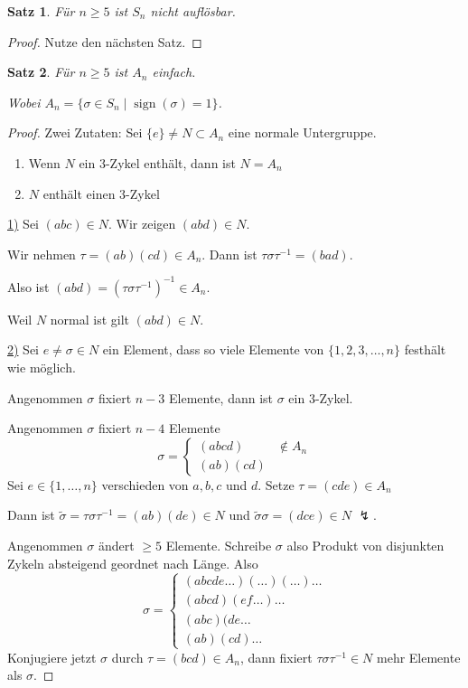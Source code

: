 \documentclass[a4paper,12pt,numbers=noenddot,parskip=full]{scrartcl}
\newcommand{\heading}{\underline}
\theoremstyle{dotless}
\newtheorem{theorem}{Satz}[section]
\theoremstyle{remark}
\begin{document}
	\begin{theorem}
		Für $n \geq 5$ ist $S_n$ nicht auflösbar.
	\end{theorem}
	
	\begin{proof}
		Nutze den nächsten Satz.
	\end{proof}

	\begin{theorem}
		Für $n \geq 5$ ist $A_n$ einfach.
		
		Wobei $A_n = \{ \sigma \in S_n \mid \operatorname{sign}(\sigma) = 1 \}$.
	\end{theorem}

	\begin{proof}
		Zwei Zutaten: Sei $\{ e \} \neq N \subset A_n$ eine normale Untergruppe.
		\begin{enumerate}
			\item Wenn $N$ ein $3$-Zykel enthält, dann ist $N = A_n$
			\item $N$ enthält einen $3$-Zykel
		\end{enumerate}
	
		\heading{1)} Sei $(a b c) \in N$. Wir zeigen $(a b d) \in N$.
		
		Wir nehmen $\tau = (ab)(cd) \in A_n$. Dann ist $\tau \sigma \tau^{-1} = (b a d)$.
		
		Also ist $(a b d) = (\tau \sigma \tau^{-1})^{-1} \in A_n$.
		
		Weil $N$ normal ist gilt $(a b d) \in N$.
		
		\heading{2)} Sei $e \neq \sigma \in N$ ein Element, dass so viele Elemente von $\{ 1, 2, 3, \dots, n \}$ festhält wie möglich.
		
		Angenommen $\sigma$ fixiert $n-3$ Elemente, dann ist $\sigma$ ein $3$-Zykel.
		
		Angenommen $\sigma$ fixiert $n-4$ Elemente
		\begin{equation*}
			\sigma = \begin{cases}
				(a b c d) & \notin A_n \\
				(a b)(c d)
			\end{cases}
		\end{equation*}
		Sei $e \in \{ 1, \dots, n\}$ verschieden von $a,b,c$ und $d$. Setze $\tau = (c d e) \in A_n$
	
		Dann ist $\tilde{\sigma} = \tau \sigma \tau^{-1} = (ab)(de) \in N$ und $\tilde{\sigma} \sigma = (d c e) \in N$ $\lightning$.
		
		Angenommen $\sigma$ ändert $\geq 5$ Elemente. Schreibe $\sigma$ also Produkt von disjunkten Zykeln absteigend geordnet nach Länge. Also
		\begin{equation*}
			\sigma = \begin{cases}
				(a b c d e \dots)(\dots)(\dots) \dots \\
				(a b c d) (e f \dots) \dots \\
				(a b c) (d e \dots \\
				(a b) (c d) \dots
			\end{cases}
		\end{equation*}
		Konjugiere jetzt $\sigma$ durch $\tau = (bcd) \in A_n$, dann fixiert $\tau \sigma \tau^{-1} \in N$ mehr Elemente als $\sigma$.
		

\end{proof}
\end{document}
